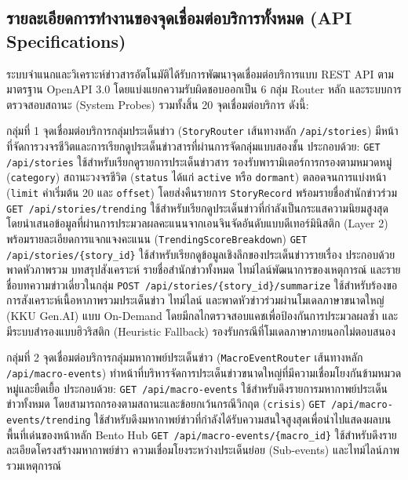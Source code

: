 \subsection{รายละเอียดการทำงานของจุดเชื่อมต่อบริการทั้งหมด (API Specifications)}

ระบบจำแนกและวิเคราะห์ข่าวสารอัตโนมัติได้รับการพัฒนาจุดเชื่อมต่อบริการแบบ REST API ตามมาตรฐาน OpenAPI 3.0 โดยแบ่งแยกความรับผิดชอบออกเป็น 6 กลุ่ม Router หลัก และระบบการตรวจสอบสถานะ (System Probes) รวมทั้งสิ้น 20 จุดเชื่อมต่อบริการ ดังนี้:

กลุ่มที่ 1 จุดเชื่อมต่อบริการกลุ่มประเด็นข่าว (\texttt{StoryRouter} เส้นทางหลัก \texttt{/api/stories}) มีหน้าที่จัดการวงจรชีวิตและการเรียกดูประเด็นข่าวสารที่ผ่านการจัดกลุ่มแบบสองชั้น ประกอบด้วย:
\texttt{GET /api/stories} ใช้สำหรับเรียกดูรายการประเด็นข่าวสาร รองรับพารามิเตอร์การกรองตามหมวดหมู่ (\texttt{category}) สถานะวงจรชีวิต (\texttt{status} ได้แก่ \texttt{active} หรือ \texttt{dormant}) ตลอดจนการแบ่งหน้า (\texttt{limit} ค่าเริ่มต้น 20 และ \texttt{offset}) โดยส่งคืนรายการ \texttt{StoryRecord} พร้อมรายชื่อสำนักข่าวร่วม
\texttt{GET /api/stories/trending} ใช้สำหรับเรียกดูประเด็นข่าวที่กำลังเป็นกระแสความนิยมสูงสุด โดยนำเสนอข้อมูลที่ผ่านการประมวลผลคะแนนจากเอนจินจัดอันดับแบบดีเทอร์มินิสติก (Layer 2) พร้อมรายละเอียดการแจกแจงคะแนน (\texttt{TrendingScoreBreakdown})
\texttt{GET /api/stories/\{story\_id\}} ใช้สำหรับเรียกดูข้อมูลเชิงลึกของประเด็นข่าวรายเรื่อง ประกอบด้วยพาดหัวภาพรวม บทสรุปสังเคราะห์ รายชื่อสำนักข่าวทั้งหมด ไทม์ไลน์พัฒนาการของเหตุการณ์ และรายชื่อบทความข่าวเดี่ยวในกลุ่ม
\texttt{POST /api/stories/\{story\_id\}/summarize} ใช้สำหรับร้องขอการสังเคราะห์เนื้อหาภาพรวมประเด็นข่าว ไทม์ไลน์ และพาดหัวข่าวร่วมผ่านโมเดลภาษาขนาดใหญ่ (KKU Gen.AI) แบบ On-Demand โดยมีกลไกตรวจสอบแคชเพื่อป้องกันการประมวลผลซ้ำ และมีระบบสำรองแบบฮิวริสติก (Heuristic Fallback) รองรับกรณีที่โมเดลภาษาภายนอกไม่ตอบสนอง

กลุ่มที่ 2 จุดเชื่อมต่อบริการกลุ่มมหากาพย์ประเด็นข่าว (\texttt{MacroEventRouter} เส้นทางหลัก \texttt{/api/macro-events}) ทำหน้าที่บริหารจัดการประเด็นข่าวขนาดใหญ่ที่มีความเชื่อมโยงกันข้ามหมวดหมู่และยืดเยื้อ ประกอบด้วย:
\texttt{GET /api/macro-events} ใช้สำหรับดึงรายการมหากาพย์ประเด็นข่าวทั้งหมด โดยสามารถกรองตามสถานะและข้อยกเว้นกรณีวิกฤต (\texttt{crisis})
\texttt{GET /api/macro-events/trending} ใช้สำหรับดึงมหากาพย์ข่าวที่กำลังได้รับความสนใจสูงสุดเพื่อนำไปแสดงผลบนพื้นที่เด่นของหน้าหลัก Bento Hub
\texttt{GET /api/macro-events/\{macro\_id\}} ใช้สำหรับดึงรายละเอียดโครงสร้างมหากาพย์ข่าว ความเชื่อมโยงระหว่างประเด็นย่อย (Sub-events) และไทม์ไลน์ภาพรวมเหตุการณ์

